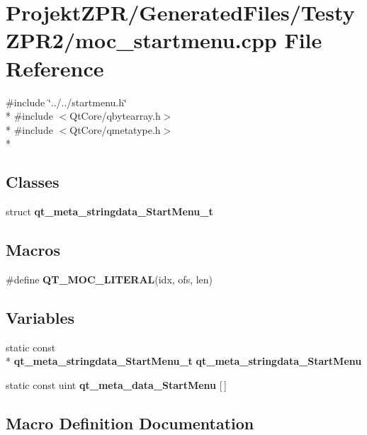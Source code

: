 \section{Projekt\-Z\-P\-R/\-Generated\-Files/\-Testy\-Z\-P\-R2/moc\-\_\-startmenu.cpp File Reference}
\label{_testy_z_p_r2_2moc__startmenu_8cpp}
{\ttfamily \#include \char`\"{}../../startmenu.\-h\char`\"{}}\\*
{\ttfamily \#include $<$Qt\-Core/qbytearray.\-h$>$}\\*
{\ttfamily \#include $<$Qt\-Core/qmetatype.\-h$>$}\\*
\subsection*{Classes}
\begin{DoxyCompactItemize}
\item 
struct {\bf qt\-\_\-meta\-\_\-stringdata\-\_\-\-Start\-Menu\-\_\-t}
\end{DoxyCompactItemize}
\subsection*{Macros}
\begin{DoxyCompactItemize}
\item 
\#define {\bf Q\-T\-\_\-\-M\-O\-C\-\_\-\-L\-I\-T\-E\-R\-A\-L}(idx, ofs, len)
\end{DoxyCompactItemize}
\subsection*{Variables}
\begin{DoxyCompactItemize}
\item 
static const \\*
{\bf qt\-\_\-meta\-\_\-stringdata\-\_\-\-Start\-Menu\-\_\-t} {\bf qt\-\_\-meta\-\_\-stringdata\-\_\-\-Start\-Menu}
\item 
static const uint {\bf qt\-\_\-meta\-\_\-data\-\_\-\-Start\-Menu} [$\,$]
\end{DoxyCompactItemize}


\subsection{Macro Definition Documentation}
